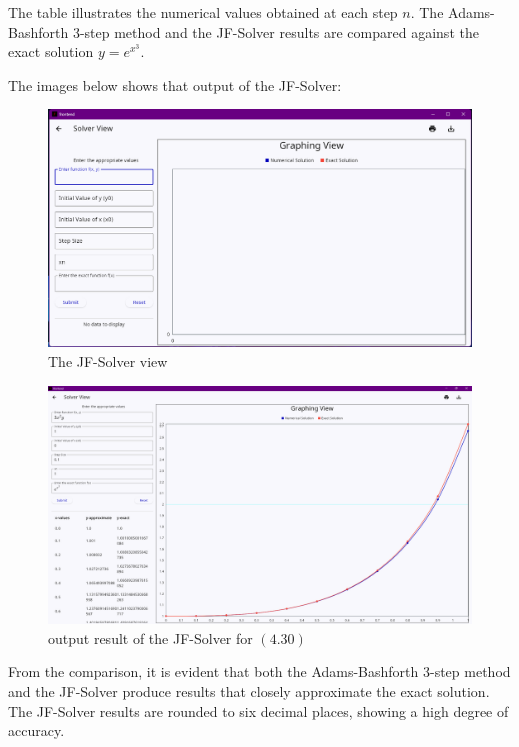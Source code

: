 The table illustrates the numerical values obtained at each step $n$. The Adams-Bashforth 3-step method and the JF-Solver results are compared against the exact solution $y = e^{x^3}$.

The images below shows that output of the JF-Solver:

\begin{figure}[htbp]
    \centering
    \includegraphics[width=1\textwidth]{chapters/4/image/solver_3.png}
    \caption{The JF-Solver view}
\end{figure}

\begin{figure}[htbp]
    \centering
    \includegraphics[width=1\textwidth]{chapters/4/image/solver_2.png}
    \caption{output result of the JF-Solver for $(4.30)$ }
\end{figure}


\pagebreak
From the comparison, it is evident that both the Adams-Bashforth 3-step method and the JF-Solver produce results that closely approximate the exact solution. The JF-Solver results are rounded to six decimal places, showing a high degree of accuracy.

